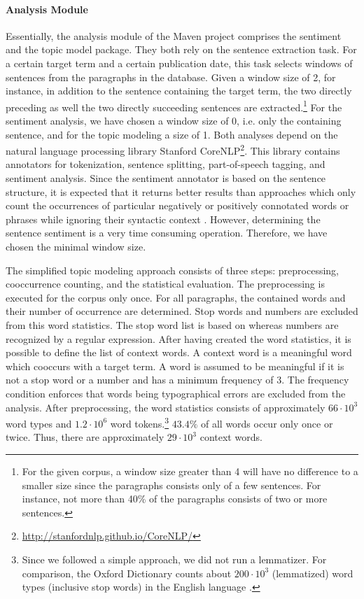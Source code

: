 \documentclass[10pt,a4paper,twocolumn]{scrartcl}
\begin{document}
\paragraph*{Analysis Module} Essentially, the analysis module of the Maven project comprises the sentiment and the topic model package. They both rely on the sentence extraction task. For a certain target term and a certain publication date, this task selects windows of sentences from the paragraphs in the database. Given a window size of 2, for instance, in addition to the sentence containing the target term, the two directly preceding as well the two directly succeeding sentences are extracted.\footnote{For the given corpus, a window size greater than 4 will have no difference to a smaller size since the paragraphs consists only of a few sentences. For instance, not more than 40\% of the paragraphs consists of two or more sentences.} For the sentiment analysis, we have chosen a window size of 0, i.e. only the containing sentence, and for the topic modeling a size of 1.  Both analyses depend on the natural language processing library Stanford CoreNLP\footnote{\url{http://stanfordnlp.github.io/CoreNLP/}}. This library contains annotators for tokenization, sentence splitting, part-of-speech tagging, and sentiment analysis. Since the sentiment annotator is based on the sentence structure, it is expected that it returns better results than approaches which only count the occurrences of particular negatively or positively connotated words or phrases while ignoring their syntactic context \citep{Socher+al:2013}. However, determining the sentence sentiment is a very time consuming operation. Therefore, we have chosen the minimal window size.

The simplified topic modeling approach consists of three steps: preprocessing, cooccurrence counting, and the statistical evaluation. The preprocessing is executed for the corpus only once. For all paragraphs, the contained words and their number of occurrence are determined. Stop words and numbers are excluded from this word statistics. The stop word list is based on \citep[p.533]{Manning+Schuetze:2003} whereas numbers are recognized by a regular expression. After having created the word statistics, it is possible to define the list of context words. A context word is a meaningful word which cooccurs with a target term. A word is assumed to be meaningful if it is not a stop word or a number and has a minimum frequency of 3. The frequency condition enforces that words being typographical errors are excluded from the analysis. After preprocessing, the word statistics consists of approximately $66\cdot 10^3$ word types and $1.2 \cdot 10^6$ word tokens.\footnote{Since we followed a simple approach, we did not run a lemmatizer. For comparison, the Oxford Dictionary counts about $200 \cdot 10^3$ (lemmatized) word types (inclusive stop words) in the English language \citep{Oxford}.}  $43.4\%$ of all words occur only once or twice. Thus, there are approximately $29\cdot 10^3$ context words.
\end{document}
